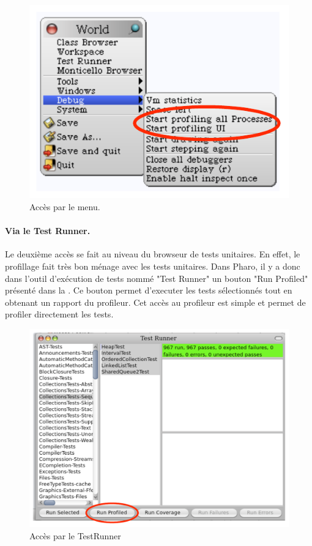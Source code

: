 \documentclass[a4paper,10pt,twoside]{book}
\begin{document}
\begin{figure}[h]
	\begin{center}
	\includegraphics[width=.6\linewidth]{menu}
	\caption{Acc\`es par le menu.}
	\end{center}
\end{figure}




\paragraph{Via le Test Runner.}
Le deuxi\`eme acc\`es se fait au niveau du browseur de tests unitaires. En effet, le profillage fait tr\`es bon m\'enage avec les tests unitaires. Dans Pharo, il y a donc dans l'outil d'ex\'ecution de tests nomm\'e "Test Runner" un bouton "Run Profiled" pr\'esent\'e dans la . Ce bouton permet d'executer les tests s\'electionn\'es tout en obtenant un rapport du profileur. Cet acc\`es au profileur est simple et permet de profiler directement les tests.

\begin{figure}[h]
	\begin{center}
	\includegraphics[width=.8\linewidth]{testRunner}
	\caption{Acc\`es par le TestRunner}
	\end{center}
\end{figure}
\end{document}
